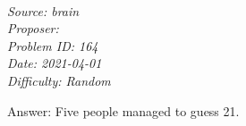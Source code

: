 \SSbreak\\
\emph{Source: brain}\\
\emph{Proposer: \Pbrain}\\ %
\emph{Problem ID: 164}\\
\emph{Date: 2021-04-01}\\
\emph{Difficulty: Random}\\
\SSbreak

\bigskip

\begin{solution}\hfil\medskip
	
	Answer:  \medskip
    Five people managed to guess 21.
\end{solution}\bigskip